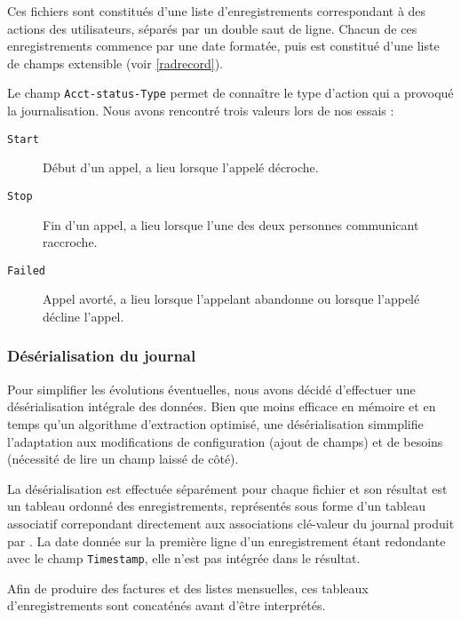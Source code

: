 
Ces fichiers sont constitués d’une liste d’enregistrements correspondant à des actions des utilisateurs, séparés par un double saut de ligne. Chacun de ces enregistrements commence par une date formatée, puis est constitué d’une liste de champs extensible (voir \cref{radrecord}).

Le champ \texttt{Acct-status-Type} permet de connaître le type d’action qui a provoqué la journalisation. Nous avons rencontré trois valeurs lors de nos essais :
\begin{description}
	\item[\texttt{Start}] Début d’un appel, a lieu lorsque l’appelé décroche.
	\item[\texttt{Stop}] Fin d’un appel, a lieu lorsque l’une des deux personnes communicant raccroche.
	\item[\texttt{Failed}] Appel avorté, a lieu lorsque l’appelant abandonne ou lorsque l’appelé décline l’appel.
\end{description}

\subsubsection{Désérialisation du journal}

Pour simplifier les évolutions éventuelles, nous avons décidé d’effectuer une désérialisation intégrale des données. Bien que moins efficace en mémoire et en temps qu’un algorithme d’extraction optimisé, une désérialisation simmplifie l’adaptation aux modifications de configuration (ajout de champs) et de besoins (nécessité de lire un champ laissé de côté).

La désérialisation est effectuée séparément pour chaque fichier et son résultat est un tableau ordonné des enregistrements, représentés sous forme d’un tableau associatif correpondant directement aux associations clé-valeur du journal produit par {\frad}. La date donnée sur la première ligne d’un enregistrement étant redondante avec le champ \texttt{Timestamp}, elle n’est pas intégrée dans le résultat.

Afin de produire des factures et des listes mensuelles, ces tableaux d’enregistrements sont concaténés avant d’être interprétés.

